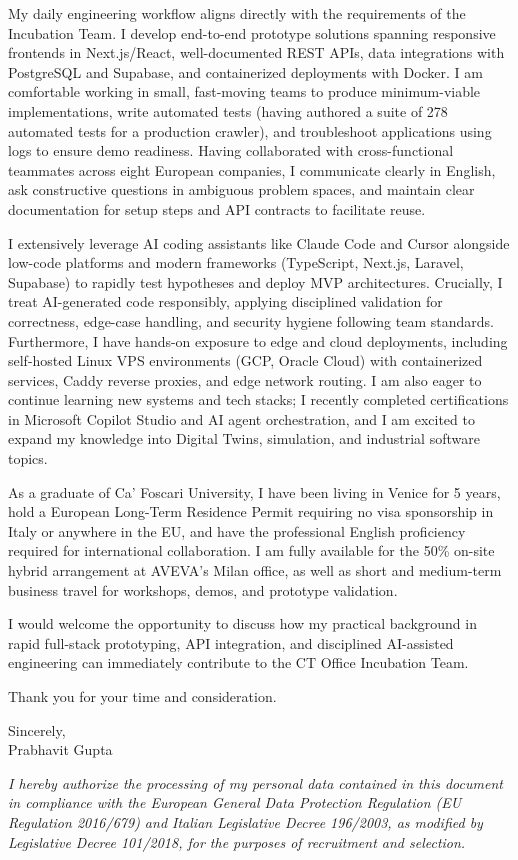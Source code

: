 \documentclass[10pt, a4paper]{article}
\begin{document}
My daily engineering workflow aligns directly with the requirements of the Incubation Team. I develop end-to-end prototype solutions spanning responsive frontends in Next.js/React, well-documented REST APIs, data integrations with PostgreSQL and Supabase, and containerized deployments with Docker. I am comfortable working in small, fast-moving teams to produce minimum-viable implementations, write automated tests (having authored a suite of 278 automated tests for a production crawler), and troubleshoot applications using logs to ensure demo readiness. Having collaborated with cross-functional teammates across eight European companies, I communicate clearly in English, ask constructive questions in ambiguous problem spaces, and maintain clear documentation for setup steps and API contracts to facilitate reuse.

I extensively leverage AI coding assistants like Claude Code and Cursor alongside low-code platforms and modern frameworks (TypeScript, Next.js, Laravel, Supabase) to rapidly test hypotheses and deploy MVP architectures. Crucially, I treat AI-generated code responsibly, applying disciplined validation for correctness, edge-case handling, and security hygiene following team standards. Furthermore, I have hands-on exposure to edge and cloud deployments, including self-hosted Linux VPS environments (GCP, Oracle Cloud) with containerized services, Caddy reverse proxies, and edge network routing. I am also eager to continue learning new systems and tech stacks; I recently completed certifications in Microsoft Copilot Studio and AI agent orchestration, and I am excited to expand my knowledge into Digital Twins, simulation, and industrial software topics.

As a graduate of Ca' Foscari University, I have been living in Venice for 5 years, hold a European Long-Term Residence Permit requiring no visa sponsorship in Italy or anywhere in the EU, and have the professional English proficiency required for international collaboration. I am fully available for the 50\% on-site hybrid arrangement at AVEVA's Milan office, as well as short and medium-term business travel for workshops, demos, and prototype validation.

I would welcome the opportunity to discuss how my practical background in rapid full-stack prototyping, API integration, and disciplined AI-assisted engineering can immediately contribute to the CT Office Incubation Team.

Thank you for your time and consideration.

Sincerely,\\[8pt]
Prabhavit Gupta

\vspace{16pt}
\begin{flushleft}
\footnotesize\textit{I hereby authorize the processing of my personal data contained in this document in compliance with the European General Data Protection Regulation (EU Regulation 2016/679) and Italian Legislative Decree 196/2003, as modified by Legislative Decree 101/2018, for the purposes of recruitment and selection.}
\end{flushleft}
\end{document}
